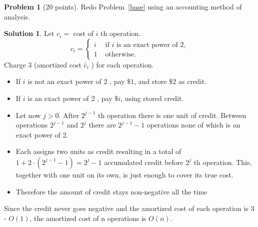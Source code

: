 \documentclass{article}
\theoremstyle{definition}
\newtheorem{problem}{Problem}
\newtheorem*{solution}{Solution}
\begin{document}
\begin{problem}[20 points]
 Redo Problem~\ref{base} using an accounting method of analysis.
\end{problem}
\begin{solution}
Let $c_i=$ cost of $i$ th operation.
$$
c_i= \begin{cases}i & \text { if } i \text { is an exact power of } 2, \\ 1 & \text { otherwise. }\end{cases}
$$
Charge 3 (amortized cost $\hat{c}_i$ ) for each operation.
\begin{itemize}
    \item If $i$ is not an exact power of 2 , pay $\$ 1$, and store $\$ 2$ as credit.
    \item If $i$ is an exact power of 2 , pay $\$ i$, using stored credit.
    \item Let now $j>0$. After $2^{j-1}$ th operation there is one unit of credit. Between operations $2^{j-1}$ and $2^j$ there are $2^{j-1}-1$ operations none of which is an exact power of 2. 
    \item Each assigns two units as credit resulting in a total of $1+2 \cdot\left(2^{j-1}-1\right)=2^j-1$ accumulated credit before $2^j$ th operation. This, together with one unit on its own, is just enough to cover its true cost. 
    \item Therefore the amount of credit stays non-negative all the time
\end{itemize}
Since the credit never goes negative and the amortized cost of each operation is 3 - $O(1)$, the amortized cost of n operations is $O(n)$.
\end{solution}
\newpage
\end{document}
